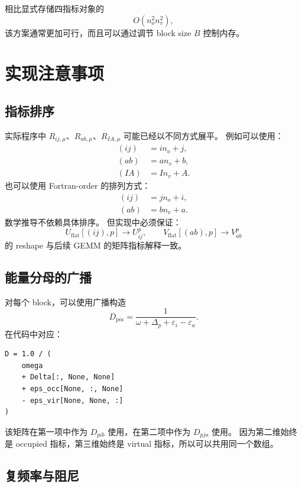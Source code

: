 \documentclass[UTF8,a4paper,11pt]{ctexart}
\newcommand{\eps}{\varepsilon}
\begin{document}
相比显式存储四指标对象的
\begin{equation}
O(n_o^2n_v^2),
\end{equation}
该方案通常更加可行，而且可以通过调节 block size $B$ 控制内存。

\section{实现注意事项}

\subsection{指标排序}

实际程序中 $R_{ij,\mu}$、$R_{ab,\mu}$、$R_{IA,\mu}$ 可能已经以不同方式展平。
例如可以使用：
\begin{align}
(ij) &= i n_o+j,
\\
(ab) &= a n_v+b,
\\
(IA) &= I n_v+A.
\end{align}
也可以使用 Fortran-order 的排列方式：
\begin{align}
(ij) &= j n_o+i,
\\
(ab) &= b n_v+a.
\end{align}
数学推导不依赖具体排序。
但实现中必须保证：
\begin{equation}
U_{\mathrm{flat}}[(ij),p]\rightarrow U^p_{ij},
\qquad
V_{\mathrm{flat}}[(ab),p]\rightarrow V^p_{ab}
\end{equation}
的 reshape 与后续 GEMM 的矩阵指标解释一致。

\subsection{能量分母的广播}

对每个 block，可以使用广播构造
\begin{equation}
D_{p i a}
=
\frac{1}{
\omega+\Delta_p+\eps_i-\eps_a
}.
\end{equation}
在代码中对应：
\begin{verbatim}
D = 1.0 / (
    omega
    + Delta[:, None, None]
    + eps_occ[None, :, None]
    - eps_vir[None, None, :]
)
\end{verbatim}

该矩阵在第一项中作为 $D_{pib}$ 使用，在第二项中作为 $D_{pja}$ 使用。
因为第二维始终是 occupied 指标，第三维始终是 virtual 指标，所以可以共用同一个数组。

\subsection{复频率与阻尼}
\end{document}
